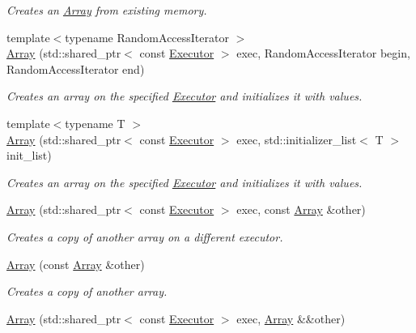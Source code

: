 \begin{DoxyCompactItemize}
\begin{DoxyCompactList}\small\item\em Creates an \hyperlink{classgko_1_1Array}{Array} from existing memory. \end{DoxyCompactList}\item 
{\footnotesize template$<$typename Random\+Access\+Iterator $>$ }\\\hyperlink{classgko_1_1Array_a473ac8d0d3fa05918064cb5f26c3a540}{Array} (std\+::shared\+\_\+ptr$<$ const \hyperlink{classgko_1_1Executor}{Executor} $>$ exec, Random\+Access\+Iterator begin, Random\+Access\+Iterator end)
\begin{DoxyCompactList}\small\item\em Creates an array on the specified \hyperlink{classgko_1_1Executor}{Executor} and initializes it with values. \end{DoxyCompactList}\item 
{\footnotesize template$<$typename T $>$ }\\\hyperlink{classgko_1_1Array_aa0aa5ae24d1006778bba7ef7419439b2}{Array} (std\+::shared\+\_\+ptr$<$ const \hyperlink{classgko_1_1Executor}{Executor} $>$ exec, std\+::initializer\+\_\+list$<$ T $>$ init\+\_\+list)
\begin{DoxyCompactList}\small\item\em Creates an array on the specified \hyperlink{classgko_1_1Executor}{Executor} and initializes it with values. \end{DoxyCompactList}\item 
\hyperlink{classgko_1_1Array_ad03ebd9c7e7d63fc3b8b7a0a9ba8d16b}{Array} (std\+::shared\+\_\+ptr$<$ const \hyperlink{classgko_1_1Executor}{Executor} $>$ exec, const \hyperlink{classgko_1_1Array}{Array} \&other)
\begin{DoxyCompactList}\small\item\em Creates a copy of another array on a different executor. \end{DoxyCompactList}\item 
\hyperlink{classgko_1_1Array_ab5c0cdf59d9920d0f72f4018a5e4a8ab}{Array} (const \hyperlink{classgko_1_1Array}{Array} \&other)
\begin{DoxyCompactList}\small\item\em Creates a copy of another array. \end{DoxyCompactList}\item 
\hyperlink{classgko_1_1Array_a7e5b32002ac86e0534b91a4808212e28}{Array} (std\+::shared\+\_\+ptr$<$ const \hyperlink{classgko_1_1Executor}{Executor} $>$ exec, \hyperlink{classgko_1_1Array}{Array} \&\&other)

\end{DoxyCompactItemize}
